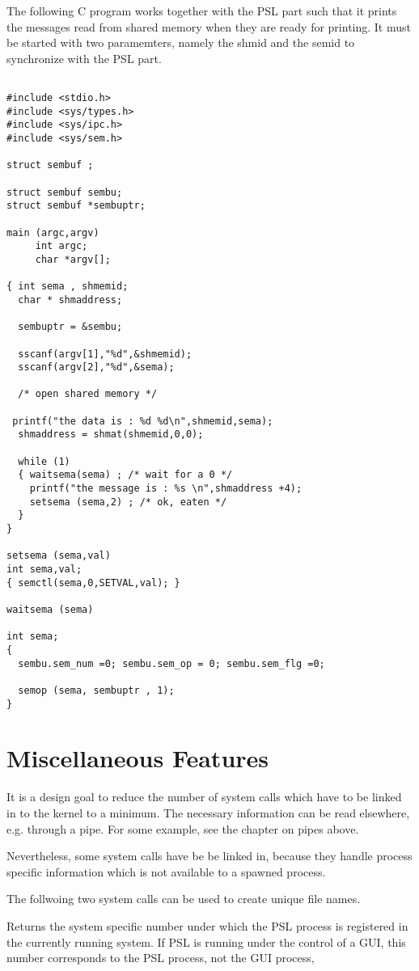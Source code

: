 The following C program works together with the PSL part
such that it prints the messages read from shared memory
when they are ready for printing. It must be started with
two paramemters, namely the shmid and the semid to synchronize
with the PSL part.

\begin{verbatim}

#include <stdio.h>
#include <sys/types.h>
#include <sys/ipc.h>
#include <sys/sem.h>

struct sembuf ;

struct sembuf sembu;
struct sembuf *sembuptr;

main (argc,argv)
     int argc;
     char *argv[];

{ int sema , shmemid;
  char * shmaddress;

  sembuptr = &sembu;

  sscanf(argv[1],"%d",&shmemid);
  sscanf(argv[2],"%d",&sema);

  /* open shared memory */

 printf("the data is : %d %d\n",shmemid,sema);
  shmaddress = shmat(shmemid,0,0);

  while (1)
  { waitsema(sema) ; /* wait for a 0 */
    printf("the message is : %s \n",shmaddress +4);
    setsema (sema,2) ; /* ok, eaten */
  }
}

setsema (sema,val)
int sema,val;
{ semctl(sema,0,SETVAL,val); }

waitsema (sema)

int sema;
{ 
  sembu.sem_num =0; sembu.sem_op = 0; sembu.sem_flg =0;

  semop (sema, sembuptr , 1);
}
\end{verbatim}

\section{Miscellaneous Features}

It is a design goal to reduce the number of system calls
which have to be linked in to the kernel to a minimum.
The necessary information can be read elsewhere, e.g. through a pipe.
For some example, see the chapter on pipes above.

Nevertheless, some system calls have be be linked in, because they 
handle process specific information which is not available to a spawned
process.

The follwoing two system calls can be used to create unique file names.

{Returns the system specific number
under which the PSL process is registered in the currently running system.
If PSL is running under the control of a GUI,
this number corresponds to the PSL process, not the GUI process,
}


